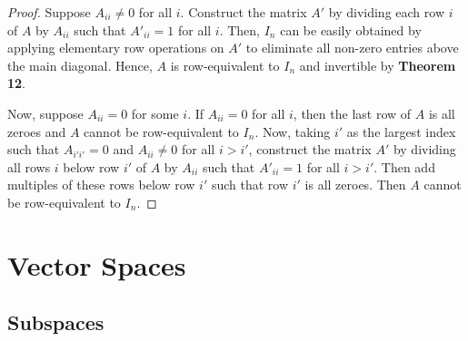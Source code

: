 \documentclass{article}
\begin{document}
\begin{proof}
  Suppose $A_{ii} \neq 0$ for all $i$. Construct the matrix $A'$ by dividing
  each row $i$ of $A$ by $A_{ii}$ such that $A'_{ii} = 1$ for all $i$. Then,
  $I_n$ can be easily obtained by applying elementary row operations on $A'$ to
  eliminate all non-zero entries above the main diagonal. Hence, $A$ is
  row-equivalent to $I_n$ and invertible by \textbf{Theorem 12}.

  Now, suppose $A_{ii} = 0$ for some $i$. If $A_{ii} = 0$ for all $i$, then the
  last row of $A$ is all zeroes and $A$ cannot be row-equivalent to $I_n$. Now,
  taking $i'$ as the largest index such that $A_{i'i'} = 0$ and $A_{ii} \neq 0$
  for all $i > i'$, construct the matrix $A'$ by dividing all rows $i$ below row
  $i'$ of $A$ by $A_{ii}$ such that $A'_{ii} = 1$ for all $i > i'$. Then add
  multiples of these rows below row $i'$ such that row $i'$ is all zeroes. Then
  $A$ cannot be row-equivalent to $I_n$.
\end{proof}

\section{Vector Spaces}

\setcounter{subsection}{1}
\subsection{Subspaces}
\end{document}
